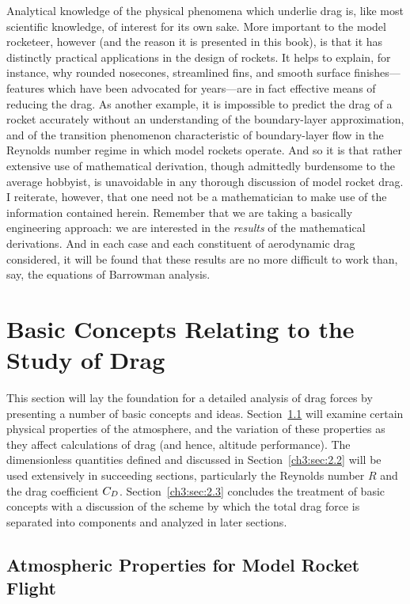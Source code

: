 Analytical knowledge of the physical phenomena which underlie drag is, like
most scientific knowledge, of interest for its own sake. More important to the
model rocketeer, however (and the reason it is presented in this book), is
that it has distinctly practical applications in the design of rockets. It
helps to explain, for instance, why rounded nosecones, streamlined fins, and
smooth surface finishes---features which have been advocated for years---are in
fact effective means of reducing the drag. As another example, it is
impossible to predict the drag of a rocket accurately without an understanding
of the boundary-layer approximation, and of the transition phenomenon
characteristic of boundary-layer flow in the Reynolds number regime in which
model rockets operate. And so it is that rather extensive use of mathematical
derivation, though admittedly burdensome to the average hobbyist, is
unavoidable in any thorough discussion of model rocket drag. I reiterate,
however, that one need not be a mathematician to make use of the information
contained herein. Remember that we are taking a basically engineering
approach: we are interested in the \emph{results} of the mathematical
derivations. And in each case and each constituent of aerodynamic drag
considered, it will be found that these results are no more difficult to work
than, say, the equations of Barrowman analysis.

\section{Basic Concepts Relating to the Study of Drag}\label{ch3:sec:2}

This section will lay the foundation for a detailed analysis of drag forces by
presenting a number of basic concepts and ideas. Section~\ref{ch3:sec:2.1} will
examine certain physical properties of the atmosphere, and the variation of
these properties as they affect calculations of drag (and hence, altitude
performance). The dimensionless quantities defined and discussed in
Section~\ref{ch3:sec:2.2} will be used extensively in succeeding sections,
particularly the Reynolds number $R$ and the drag coefficient $C_{D}$.
Section~\ref{ch3:sec:2.3} concludes the treatment of basic concepts with a
discussion of the scheme by which the total drag force is separated into
components and analyzed in later sections.

\subsection{Atmospheric Properties for Model Rocket Flight}\label{ch3:sec:2.1}


